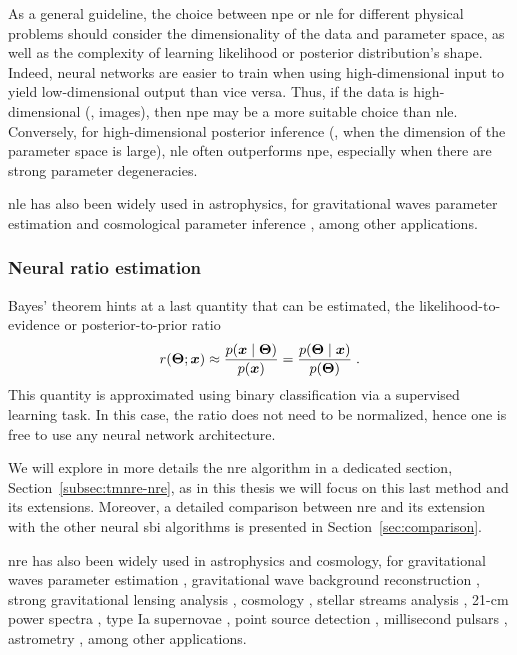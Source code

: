 As a general guideline, the choice between \gls*{npe} or \gls*{nle} for different physical problems should consider the dimensionality of the data and parameter space, as well as the complexity of learning likelihood or posterior distribution's shape. Indeed, neural networks are easier to train when using high-dimensional input to yield low-dimensional output than vice versa. Thus, if the data is high-dimensional (\eg, images), then \gls*{npe} may be a more suitable choice than \gls*{nle}. Conversely, for high-dimensional posterior inference (\ie, when the dimension of the parameter space is large), \gls*{nle} often outperforms \gls*{npe}, especially when there are strong parameter degeneracies. 

\Gls*{nle} has also been widely used in astrophysics, for gravitational waves parameter estimation \cite{Vilchez:2024qnw} and cosmological parameter inference \cite{Alsing:2019xrx, Modi:2023drt, Makinen:2021nly, DES:2024xij, Jeffrey:2020aa, vonWietersheim-Kramsta:2024cks}, among other applications.


\subsubsection{Neural ratio estimation}

Bayes' theorem hints at a last quantity that can be estimated, the likelihood-to-evidence or posterior-to-prior ratio 
\begin{equation}
	r(\bm{\Theta};\bm{x})\approx\frac{p(\bm{x}\mid\bm{\Theta})}{p(\bm{x})}=\frac{p(\bm{\Theta}\mid\bm{x})}{p(\bm{\Theta})}\; .
\end{equation}
This quantity is approximated using binary classification via a supervised learning task. In this case, the ratio does not need to be normalized, hence one is free to use any neural network architecture. 

We will explore in more details the \gls*{nre} algorithm in a dedicated section, Section~\ref{subsec:tmnre-nre}, as in this thesis we will focus on this last method and its extensions. Moreover, a detailed comparison between \gls*{nre} and its extension with the other neural \gls*{sbi} algorithms is presented in Section~\ref{sec:comparison}.

\Gls*{nre} has also been widely used in astrophysics and cosmology, for gravitational waves parameter estimation \cite{Bhardwaj:2023xph, Alvey:2023naa}, gravitational wave background reconstruction \cite{Alvey:2023npw}, strong gravitational lensing analysis \cite{Montel:2022fhv,  Coogan:2022cky, Brehmer:2019jyt, Zhang:2022djp}, cosmology \cite{List:2023aa, Cole:2021gwr, FrancoAbellan:2024tbj}, stellar streams analysis \cite{Hermans:2020skz, albatross}, 21-cm power spectra \cite{Saxena:2023tue}, type Ia supernovae \cite{Karchev:2022xyn, Karchev:2024stw}, point source detection \cite{AnauMontel:2022ppb}, millisecond pulsars \cite{Berteaud:2024zda}, astrometry \cite{Mishra-Sharma:2021nhh}, among other applications. 


